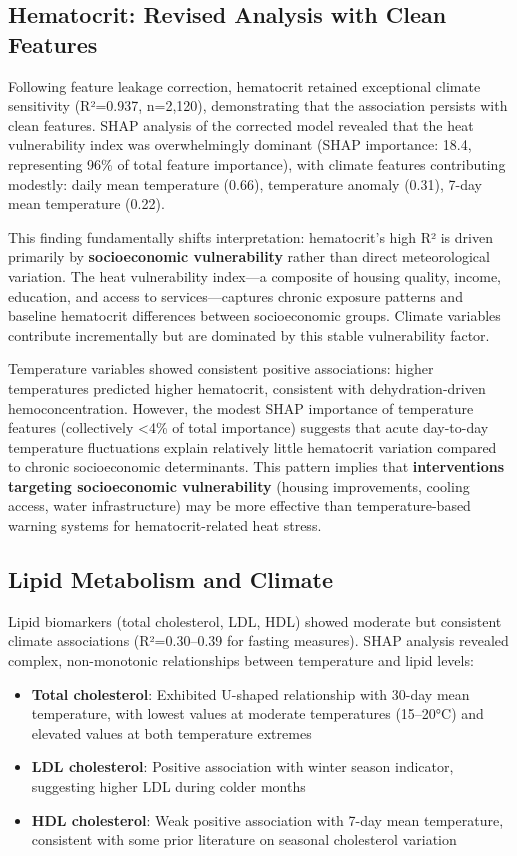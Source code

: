 \subsection{Hematocrit: Revised Analysis with Clean Features}

Following feature leakage correction, hematocrit retained exceptional climate sensitivity (R²=0.937, n=2,120), demonstrating that the association persists with clean features. SHAP analysis of the corrected model revealed that the heat vulnerability index was overwhelmingly dominant (SHAP importance: 18.4, representing 96\% of total feature importance), with climate features contributing modestly: daily mean temperature (0.66), temperature anomaly (0.31), 7-day mean temperature (0.22).

This finding fundamentally shifts interpretation: hematocrit's high R² is driven primarily by \textbf{socioeconomic vulnerability} rather than direct meteorological variation. The heat vulnerability index---a composite of housing quality, income, education, and access to services---captures chronic exposure patterns and baseline hematocrit differences between socioeconomic groups. Climate variables contribute incrementally but are dominated by this stable vulnerability factor.

Temperature variables showed consistent positive associations: higher temperatures predicted higher hematocrit, consistent with dehydration-driven hemoconcentration. However, the modest SHAP importance of temperature features (collectively <4\% of total importance) suggests that acute day-to-day temperature fluctuations explain relatively little hematocrit variation compared to chronic socioeconomic determinants. This pattern implies that \textbf{interventions targeting socioeconomic vulnerability} (housing improvements, cooling access, water infrastructure) may be more effective than temperature-based warning systems for hematocrit-related heat stress.

\subsection{Lipid Metabolism and Climate}

Lipid biomarkers (total cholesterol, LDL, HDL) showed moderate but consistent climate associations (R²=0.30--0.39 for fasting measures). SHAP analysis revealed complex, non-monotonic relationships between temperature and lipid levels:

\begin{itemize}
    \item \textbf{Total cholesterol}: Exhibited U-shaped relationship with 30-day mean temperature, with lowest values at moderate temperatures (15--20°C) and elevated values at both temperature extremes
    \item \textbf{LDL cholesterol}: Positive association with winter season indicator, suggesting higher LDL during colder months
    \item \textbf{HDL cholesterol}: Weak positive association with 7-day mean temperature, consistent with some prior literature on seasonal cholesterol variation
\end{itemize}

